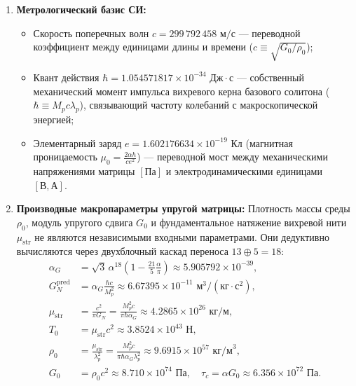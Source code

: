 \documentclass[11pt,a4paper]{article}
\theoremstyle{definition}
\theoremstyle{remark}
\begin{document}
\begin{enumerate}
	\item \textbf{Метрологический базис СИ:}
\begin{itemize}
	\item Скорость поперечных волн $c = 299\,792\,458\text{ м/с}$ — переводной коэффициент между единицами длины и времени ($c \equiv \sqrt{G_0 / \rho_0}$);
	\item Квант действия $\hbar = 1.054571817 \times 10^{-34}\text{ Дж}\cdot\text{с}$ — собственный механический момент импульса вихревого керна базового солитона ($\hbar \equiv M_p c \lambda_p$), связывающий частоту колебаний с макроскопической энергией;
	\item Элементарный заряд $e = 1.602176634 \times 10^{-19}\text{ Кл}$ (магнитная проницаемость $\mu_0 = \frac{2\alpha h}{c e^2}$) — переводной мост между механическими напряжениями матрицы $[\text{Па}]$ и электродинамическими единицами $[\text{В}, \text{А}]$.
\end{itemize}
\item \textbf{Производные макропараметры упругой матрицы:}
	Плотность массы среды $\rho_0$, модуль упругого сдвига $G_0$ и фундаментальное натяжение вихревой нити $\mu_{\mathrm{str}}$ не являются независимыми входными параметрами. Они дедуктивно вычисляются через двухблочный каскад переноса $13 \oplus 5 = 18$:
\begin{align}
	\alpha_G &= \sqrt{3}\,\alpha^{18}\left(1 - \frac{21}{5}\frac{\alpha}{\pi}\right) \approx 5.905792 \times 10^{-39}, \label{eq:alpha_G_master_def} \\
	G_N^{\mathrm{pred}} &= \alpha_G \frac{\hbar c}{M_p^2} \approx 6.67395 \times 10^{-11}\text{ м}^3/(\text{кг}\cdot\text{с}^2), \label{eq:G_N_master_def} \\
\mu_{\mathrm{str}} &= \frac{c^2}{\pi G_N} = \frac{M_p^2 c}{\pi \hbar \alpha_G} \approx 4.2865 \times 10^{26}\text{ кг/м}, \label{eq:mu_str_master_def} \\
T_0 &= \mu_{\mathrm{str}} c^2 \approx 3.8524 \times 10^{43}\text{ Н}, \label{eq:T_0_master_def} \\
\rho_0 &= \frac{\mu_{\mathrm{str}}}{\lambda_p^2} = \frac{M_p^2 c}{\pi \hbar \alpha_G \lambda_p^2} \approx 9.6915 \times 10^{57}\text{ кг/м}^3, \label{eq:rho_0_master_def} \\
G_0 &= \rho_0 c^2 \approx 8.710 \times 10^{74}\text{ Па}, \quad \tau_c = \alpha G_0 \approx 6.356 \times 10^{72}\text{ Па}. \label{eq:G_0_master_def}
\end{align}
\end{enumerate}
\end{document}
